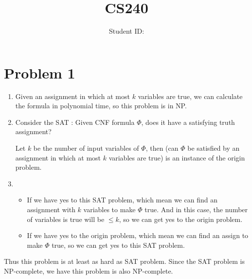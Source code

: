 \documentclass{article}
\title{CS240 \exerciseset}
\author{\studentname \qquad Student ID: \suid}
\begin{document}
\maketitle

\section*{Problem 1}
\begin{enumerate}[1)]
    \item  Given an assignment in which at most $k$ variables are true, we can calculate the formula in polynomial time,
    so this problem is in NP.
    \item 
    Consider the SAT : Given CNF formula $\Phi $, does it have a satisfying truth assignment?

    Let $k$ be the number of input variables of $\Phi$, 
    then (can $\Phi$ be satisfied by an assignment in which at most $k$ variables are true) is an instance of the origin problem.
    \item 
    \begin{itemize}
        \item If we have yes to this SAT problem, which mean we can find an assignment with $k$ variables to make $\Phi$ true. And in this case, the number of variables is true will be $\leqslant k$, so we can get yes to the origin problem.
        \item If we have yes to the origin problem, which mean we can find an assign to make $\Phi$ true, so we can get yes to this SAT problem.
    \end{itemize}
    
\end{enumerate}
Thus this problem is at least as hard as SAT problem.
Since the SAT problem is NP-complete, 
we have this problem is also NP-complete.



\pagebreak
\end{document}
